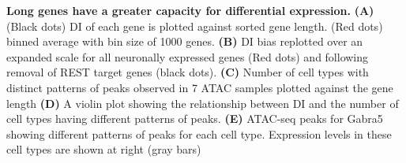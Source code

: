 \textbf{Long genes have a greater capacity for differential expression.}
\textbf{(A)} (Black dots) DI of each gene is plotted against sorted gene length. (Red dots) binned average with bin size of 1000 genes.
\textbf{(B)} DI bias replotted over an expanded scale for all neuronally expressed genes (Red dots) and following removal of REST target genes (black dots).
\textbf{(C)} Number of cell types with distinct patterns of peaks observed in 7 ATAC samples plotted against the gene length
\textbf{(D)} A violin plot showing the relationship between DI and the number of cell types having different patterns of peaks. 
\textbf{(E)} ATAC-seq peaks for Gabra5 showing different patterns of peaks for each cell type. Expression levels in these cell types are shown at right (gray bars)
